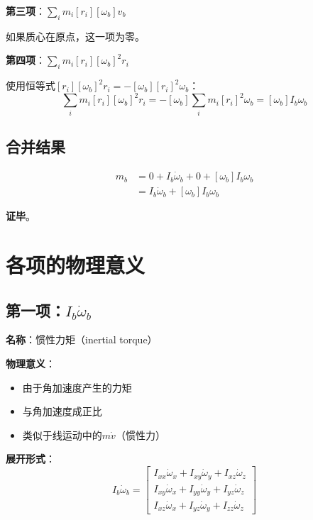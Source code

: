 \documentclass[12pt,a4paper]{article}
\begin{document}
\textbf{第三项}：$\sum_i m_i [r_i][\omega_b] v_b$

如果质心在原点，这一项为零。

\textbf{第四项}：$\sum_i m_i [r_i][\omega_b]^2 r_i$

使用恒等式$[r_i][\omega_b]^2 r_i = -[\omega_b][r_i]^2 \omega_b$：
\begin{equation}
\sum_i m_i [r_i][\omega_b]^2 r_i = -[\omega_b] \sum_i m_i [r_i]^2 \omega_b = [\omega_b] I_b \omega_b
\end{equation}

\subsection{合并结果}

\begin{align}
m_b &= 0 + I_b \dot{\omega}_b + 0 + [\omega_b] I_b \omega_b \\
&= I_b \dot{\omega}_b + [\omega_b] I_b \omega_b
\end{align}

\textbf{证毕}。

\section{各项的物理意义}

\subsection{第一项：$I_b \dot{\omega}_b$}

\textbf{名称}：惯性力矩（inertial torque）

\textbf{物理意义}：
\begin{itemize}
\item 由于角加速度产生的力矩
\item 与角加速度成正比
\item 类似于线运动中的$m \dot{v}$（惯性力）
\end{itemize}

\textbf{展开形式}：
\begin{equation}
I_b \dot{\omega}_b = \begin{bmatrix}
I_{xx} \dot{\omega}_x + I_{xy} \dot{\omega}_y + I_{xz} \dot{\omega}_z \\
I_{xy} \dot{\omega}_x + I_{yy} \dot{\omega}_y + I_{yz} \dot{\omega}_z \\
I_{xz} \dot{\omega}_x + I_{yz} \dot{\omega}_y + I_{zz} \dot{\omega}_z
\end{bmatrix}
\end{equation}
\end{document}
